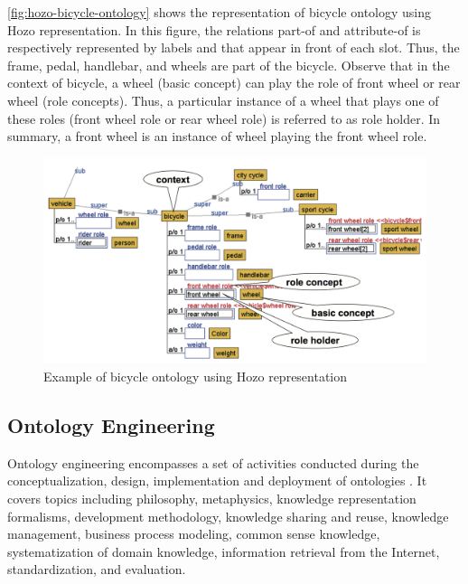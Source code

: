 \autoref{fig:hozo-bicycle-ontology} shows the representation of bicycle ontology using Hozo representation. In this figure, the relations part-of and attribute-of is respectively represented by labels  and  that appear in front of each slot. Thus, the frame, pedal, handlebar, and wheels are part of the bicycle. Observe that in the context of bicycle, a wheel (basic concept) can play the role of front wheel or rear wheel (role concepts). Thus, a particular instance of a wheel that plays one of these roles (front wheel role or rear wheel role) is referred to as role holder. In summary, a front wheel is an instance of wheel playing the front wheel role.

\begin{figure}[htb]
 \caption{Example of bicycle ontology using Hozo representation}
 \label{fig:hozo-bicycle-ontology}
 \centering
 \includegraphics[width=1\textwidth]{images/chap-general-background/hozo-bicycle-ontology.png}
\end{figure}

\subsection{Ontology Engineering}
\label{subsec:ontology-engineering}

Ontology engineering encompasses a set of activities conducted during the conceptualization, design, implementation and deployment of ontologies \cite{Devedzic2002,Devedzic2006}. It covers topics including philosophy, metaphysics, knowledge representation formalisms, development methodology, knowledge sharing and reuse, knowledge management, business process modeling, common sense knowledge, systematization of domain knowledge, information retrieval from the Internet, standardization, and evaluation.

